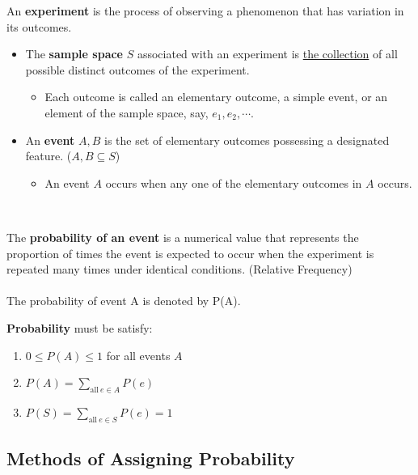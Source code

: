 \documentclass[12pt,a4paper]{article}
\newcommand{\dispsty}{\displaystyle}
\begin{document}
\begin{tcolorbox}[colback=white]
	An \textbf{experiment} is the process of observing a phenomenon that has variation in its outcomes.
\end{tcolorbox}

\begin{tcolorbox}[colback=white]
	\begin{itemize}
	\item The \textbf{sample space} $S$ associated with an experiment is \underline{the collection} of all
	possible distinct outcomes of the experiment. \begin{itemize} \item Each outcome is called an elementary outcome, a simple event, or an element of the sample space, say, $e_1, e_2, \cdots$. \end{itemize}
	\item An \textbf{event} $A, B$ is the set of elementary outcomes possessing a designated feature. ($A,B\subseteq S$) \begin{itemize}
		\item An event $A$ occurs when any one of the elementary outcomes in $A$ occurs.
	\end{itemize}
	\end{itemize}
\end{tcolorbox}\
\begin{tcolorbox}[colback=white]
	The \textbf{probability of an event} is a numerical value that represents the proportion of times the event is expected to occur when the experiment is repeated many times under identical conditions. (Relative Frequency) \\
	\\
	The probability of event A is denoted by P(A).\\ \begin{tcolorbox}[colback=white]
		\textbf{Probability} must be satisfy: \begin{enumerate}
			\item \(0\leq P(A)\leq1 \) for all events $A$
			\item \(\dispsty P(A)=\sum_{\text{all}\ e\in A}P(e) \)
			\item \(\dispsty P(S)=\sum_{\text{all}\ e\in S}P(e) =1 \)
		\end{enumerate}
	\end{tcolorbox}
\end{tcolorbox}

\subsection{Methods of Assigning Probability}
\end{document}

